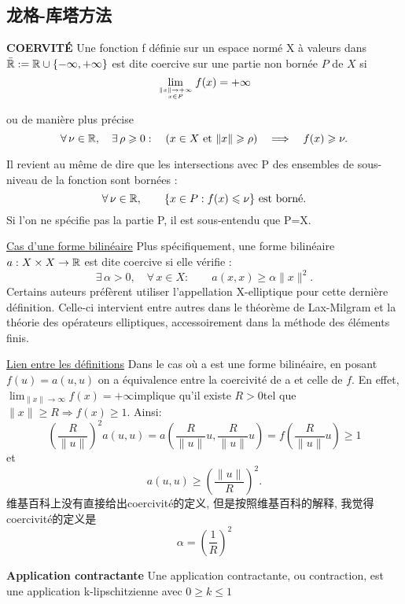 \documentclass{book}
\begin{document}
\subsection{龙格-库塔方法}

\textbf{COERVIT\'E}
Une fonction f d\'efinie sur un espace norm\'e X \`a valeurs dans $ \bar{\mathbb{R}}:=\mathbb{R}\cup\{-\infty,+\infty\}$ est dite coercive sur une partie non born\'ee $ P$ de $X$ si
$$ \lim_{\mytop{\| x\| \to +\infty}{x\in P}}f(x)=+\infty $$

ou de mani\`ere plus pr\'ecise
$$
\forall\,\nu\in\mathbb{R},\quad \exists\,\rho\geqslant0:\quad (x\in X ~\mbox{et}~ \|x\|\geqslant\rho) \quad\Longrightarrow\quad f(x)\geqslant\nu.
$$

Il revient au m\^eme de dire que les intersections avec P des ensembles de sous-niveau de la fonction sont born\'ees :
$$
\forall\,\nu\in\mathbb{R},\qquad\{x\in P: f(x)\leqslant\nu\}~\mbox{est born\'e.}
$$
Si l'on ne sp\'ecifie pas la partie P, il est sous-entendu que P=X.

\underline{Cas d'une forme bilin\'eaire} \newline
Plus sp\'ecifiquement, une forme bilin\'eaire $a:X\times X\to\mathbb{R}$ est dite coercive si elle v\'erifie :
$$
\exists\,\alpha>0,\quad\forall\,x\in X:\qquad a(x,x) \geqslant \alpha\|x\|^2.
$$
Certains auteurs pr\'ef\`erent utiliser l'appellation X-elliptique pour cette derni\`ere d\'efinition. Celle-ci intervient entre autres dans le th\'eor\`eme de Lax-Milgram et la th\'eorie des op\'erateurs elliptiques, accessoirement dans la m\'ethode des \'el\'ements finis.

\underline{Lien entre les d\'efinitions}\newline
Dans le cas où a est une forme bilin\'eaire, en posant $f(u)=a(u,u)$ on a \'equivalence entre la coercivit\'e de a et celle de $f$. En effet, $\scriptstyle\lim_{\| x\|\to\infty}f(x)=+\infty $implique qu'il existe $R>0 $tel que $\scriptstyle\|x\|\geqslant R\Rightarrow f(x)\geqslant 1$. Ainsi:
$$
\left(\frac{R}{\|u\|}\right)^2a(u,u)=a\left(\frac{R}{\|u\|}u,\frac{R}{\|u\|}u\right)=f\left(\frac{R}{\|u\|}u\right)\geqslant 1
$$
et
$$
a(u,u)\geqslant\left(\frac{\|u\|}{R}\right)^2.
$$
维基百科上没有直接给出coercivit\'e的定义, 但是按照维基百科的解释, 我觉得coercivit\'e的定义是
$$
 \alpha=\left(\frac{1}{R}\right)^2
$$

\bigskip
\textbf{Application contractante}\newline
Une application contractante, ou contraction, est une application k-lipschitzienne avec $0 \geq k \le 1$
\bigskip
\end{document}
